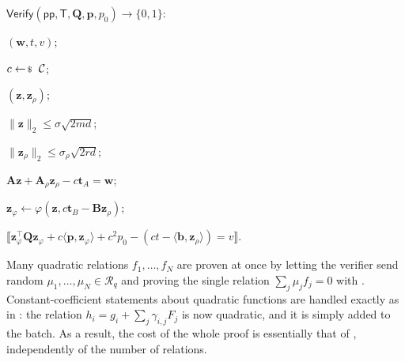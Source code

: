 \documentclass[../../book.tex]{subfiles}
\begin{document}
\begin{algoproto}[ht]
\begin{mdframed}[linecolor=black, linewidth=1pt,
                     skipabove=10pt, skipbelow=10pt,
                     innerleftmargin=5pt, innerrightmargin=5pt]
\begin{minipage}[t]{0.5\linewidth}
        \end{minipage}
        \hfill
        \begin{minipage}[t]{0.47\linewidth}
            \colorbox{oc-blue-1}{$\mathsf{Verify}(\mathsf{pp}, \mathsf{T}, \mathbf{Q}, \mathbf{p}, p_0) \to \{0,1\}$:}
            \begin{algoen}
                \item {} $(\mathbf{w}, t, v)$;
                \item {} $c \leftarrowS \mathcal{C}$; 
                \item {} $(\mathbf{z}, \mathbf{z}_{\rho})$;
                \item {} $\|\mathbf{z}\|_2 \leq \sigma\sqrt{2md}$;
                \item {} $\|\mathbf{z}_{\rho}\|_2 \leq \sigma_{\rho}\sqrt{2rd}$;
                \item {} $\mathbf{A}\mathbf{z} + \mathbf{A}_{\rho}\mathbf{z}_{\rho} - c\mathbf{t}_A = \mathbf{w}$;
                \item $\mathbf{z}_{\varphi} \gets \varphi(\mathbf{z}, c\mathbf{t}_B - \mathbf{B}\mathbf{z}_{\rho})$;
                \item {} $\llbracket \mathbf{z}_{\varphi}^{\top}\mathbf{Q}\mathbf{z}_{\varphi} + c\langle \mathbf{p}, \mathbf{z}_{\varphi} \rangle + c^2p_0 - (ct - \langle \mathbf{b}, \mathbf{z}_{\rho} \rangle) = v \rrbracket$.
            \end{algoen}
        \end{minipage}
    \end{mdframed}
    \caption{Proof of a quadratic relation $f(\mathbf{x}_{\varphi}) = 0$ over $\mathcal{R}_q$ for the extended witness $\mathbf{x}_{\varphi} = (\mathbf{x}, \mathbf{x}^{\ast}, \mathbf{m}, \mathbf{m}^{\ast})$~\cite[Fig.~6]{C:LyuNguPla22}. 
    Note that $\mathcal{C} \subseteq \{c \in \mathcal{R}_q: c^{\ast}=c\}$.}
    \label{fig:lnp22-quadratic}
\end{algoproto}

Many quadratic relations $f_1, \dots, f_N$ are proven at once by letting the verifier send random $\mu_1, \dots, \mu_N \in \mathcal{R}_q$ and proving the single relation $\sum_j \mu_jf_j = 0$ with .
Constant-coefficient statements about quadratic functions are handled exactly as in : the relation $h_i = g_i + \sum_j \gamma_{i,j}F_j$ is now quadratic, and it is simply added to the batch.
As a result, the cost of the whole proof is essentially that of , independently of the number of relations.
\end{document}
